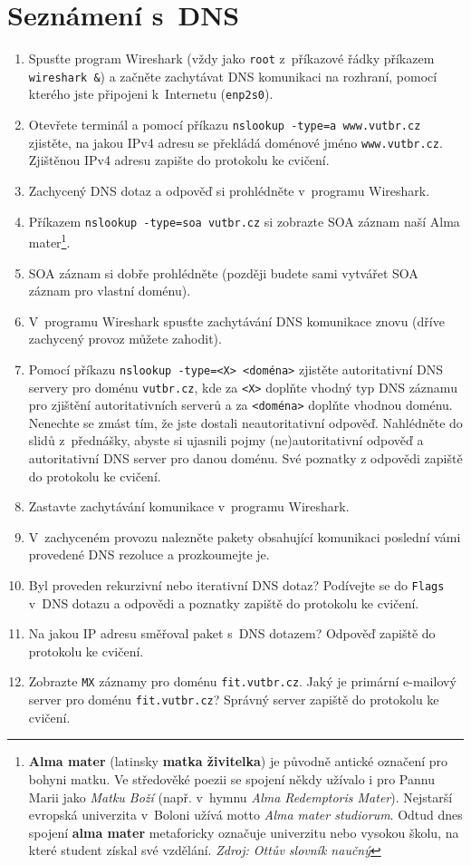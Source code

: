 \section{Seznámení s~DNS}
\begin{enumerate}
    \item Spusťte program Wireshark (vždy jako \texttt{root} z~příkazové řádky příkazem \texttt{wireshark \&}) a začněte zachytávat DNS komunikaci na rozhraní, pomocí kterého jste připojeni k~Internetu (\texttt{enp2s0}).
    \item Otevřete terminál a pomocí příkazu \texttt{nslookup -type=a www.vutbr.cz} zjistěte, na jakou IPv4 adresu se překládá doménové jméno \texttt{www.vutbr.cz}. Zjištěnou IPv4 adresu zapište do protokolu ke cvičení.
    \item Zachycený DNS dotaz a odpověď si prohlédněte v~programu Wireshark.
    \item Příkazem \texttt{nslookup -type=soa vutbr.cz} si zobrazte SOA záznam naší Alma mater\footnote{\textbf{Alma mater} (latinsky \textbf{matka živitelka}) je původně antické označení pro bohyni matku. Ve středověké poezii se spojení někdy užívalo i pro Pannu Marii jako \emph{Matku Boží} (např. v~hymnu \emph{Alma Redemptoris Mater}). Nejstarší evropská univerzita v~Boloni užívá motto \emph{Alma mater studiorum}. Odtud dnes spojení \textbf{alma mater} metaforicky označuje univerzitu nebo vysokou školu, na které student získal své vzdělání. \emph{Zdroj: Ottův slovník naučný}}.
    \item SOA záznam si dobře prohlédněte (později budete sami vytvářet SOA záznam pro vlastní doménu).
    \item V~programu Wireshark spusťte zachytávání DNS komunikace znovu (dříve zachycený provoz můžete zahodit).
    \item Pomocí příkazu \texttt{nslookup -type=<X> <doména>} zjistěte autoritativní DNS servery pro doménu \texttt{vutbr.cz}, kde za \texttt{<X>} doplňte vhodný typ DNS záznamu pro zjištění autoritativních serverů a za \texttt{<doména>} doplňte vhodnou doménu. Nenechte se zmást tím, že jste dostali neautoritativní odpověď. Nahlédněte do slidů z~přednášky, abyste si ujasnili pojmy (ne)autoritativní odpověď a autoritativní DNS server pro danou doménu. Své poznatky z odpovědi zapiště do protokolu ke cvičení.
    \item Zastavte zachytávání komunikace v~programu Wireshark.
    \item V~zachyceném provozu nalezněte pakety obsahující komunikaci poslední vámi provedené DNS rezoluce a prozkoumejte je.
    \item Byl proveden rekurzivní nebo iterativní DNS dotaz? Podívejte se do \texttt{Flags} v~DNS dotazu a odpovědi a poznatky zapiště do protokolu ke cvičení.
    \item Na jakou IP adresu směřoval paket s~DNS dotazem? Odpověď zapiště do protokolu ke cvičení.
    \item Zobrazte \texttt{MX} záznamy pro doménu \texttt{fit.vutbr.cz}. Jaký je primární e-mailový server pro doménu \texttt{fit.vutbr.cz}? Správný server zapiště do protokolu ke cvičení.
\end{enumerate}

